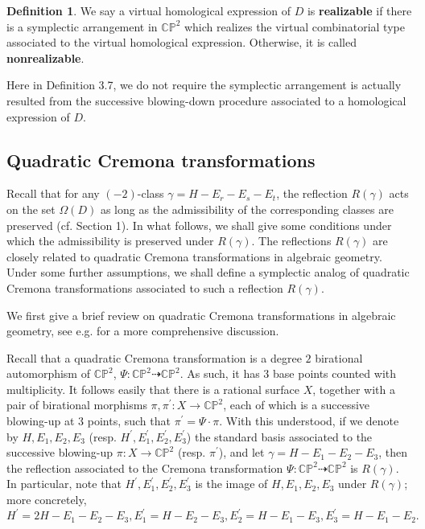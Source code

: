 \documentclass[11pt]{amsart}
\theoremstyle{plain}
\numberwithin{theorem}{section}
\theoremstyle{definition}
\newtheorem{definition}[theorem]{Definition}
\newcommand{\C}{{\mathbb C}}
\renewcommand{\P}{{\mathbb P}}
\begin{document}
\begin{definition}
We say a virtual homological expression of $D$ is {\bf realizable} if there is a symplectic arrangement in $\C\P^2$ which realizes the virtual combinatorial type associated to the virtual homological expression. Otherwise, it is called {\bf nonrealizable}. 
\end{definition}

Here in Definition 3.7, we do not require the symplectic arrangement is actually resulted from the successive blowing-down procedure associated to a homological expression of $D$.


\subsection{Quadratic Cremona transformations}
Recall that for any $(-2)$-class $\gamma=H-E_r-E_s-E_t$, the reflection $R(\gamma)$ acts on the set
$\Omega(D)$ as long as the admissibility of the corresponding classes are preserved (cf. Section 1).
In what follows, we shall give some conditions under which the admissibility is preserved under $R(\gamma)$. 
The reflections $R(\gamma)$ are closely related to quadratic Cremona transformations in algebraic geometry. 
Under some further assumptions, we shall define a symplectic analog of quadratic Cremona transformations
associated to such a reflection $R(\gamma)$.

We first give a brief review on quadratic Cremona transformations in algebraic geometry, see e.g. \cite{AC, Moe} 
for a more comprehensive discussion. 

Recall that a quadratic Cremona transformation is a degree $2$ birational automorphism of $\C\P^2$, $\Psi: \C\P^2\dashrightarrow \C\P^2$. As such, it has $3$ base points counted with multiplicity. It follows easily that there is a rational surface $X$, together with a pair of birational morphisms $\pi, \pi^\prime: X\rightarrow \C\P^2$, each of which is a successive blowing-up at $3$ points, such that $\pi^\prime=\Psi\cdot \pi$. 
With this understood, if we denote by $H,E_1,E_2,E_3$ (resp. $H^\prime,E_1^\prime,E_2^\prime,E_3^\prime$) the standard basis associated to the successive blowing-up $\pi: X\rightarrow \C\P^2$ (resp. $\pi^\prime$), and let 
$\gamma=H-E_1-E_2-E_3$, then the reflection associated to the Cremona transformation 
$\Psi: \C\P^2\dashrightarrow \C\P^2$ is $R(\gamma)$. In particular, note that 
$H^\prime,E_1^\prime,E_2^\prime,E_3^\prime$ is the image of $H,E_1,E_2,E_3$ under $R(\gamma)$; more concretely, 
$$
H^\prime=2H-E_1-E_2-E_3,E_1^\prime=H-E_2-E_3, E_2^\prime=H-E_1-E_3, E_3^\prime=H-E_1-E_2.
$$
\end{document}
